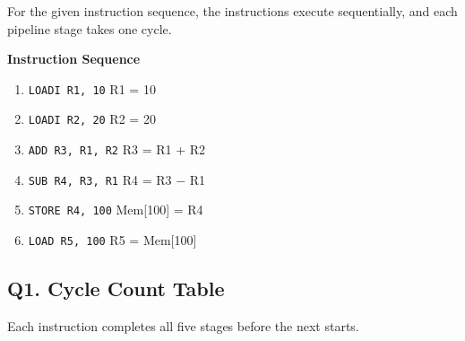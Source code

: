 \documentclass[11pt,letterpaper]{article}
\begin{document}
For the given instruction sequence, the instructions execute sequentially, and each pipeline stage takes one cycle.

\textbf{Instruction Sequence}
\begin{enumerate}
\item \texttt{LOADI R1, 10} \quad R1 = 10
\item \texttt{LOADI R2, 20} \quad R2 = 20
\item \texttt{ADD R3, R1, R2} \quad R3 = R1 + R2
\item \texttt{SUB R4, R3, R1} \quad R4 = R3 $-$ R1
\item \texttt{STORE R4, 100} \quad Mem[100] = R4
\item \texttt{LOAD R5, 100} \quad R5 = Mem[100]
\end{enumerate}
\subsection*{Q1. Cycle Count Table}
Each instruction completes all five stages before the next starts.
\end{document}
